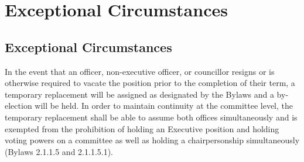 \section{Exceptional Circumstances}
\subsection {Exceptional Circumstances}
\begin{longenum}[ label*=\thesubsection.\arabic*., align=left]
	\item In the event that an officer, non-executive officer, or councillor resigns or is otherwise required to vacate the position prior to the completion of their term, a temporary replacement will be assigned as designated by the Bylaws and a by-election will be held. In order to maintain continuity at the committee level, the temporary replacement shall be able to assume both offices simultaneously and is exempted from the prohibition of holding an Executive position and holding voting powers on a committee as well as holding a chairpersonship simultaneously (Bylaws 2.1.1.5 and 2.1.1.5.1).
\end{longenum}

